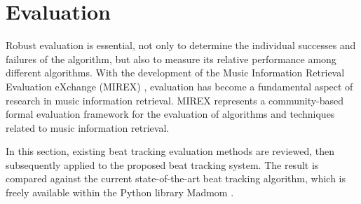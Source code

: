 \documentclass{scrartcl}
\begin{document}



\newpage
\section{Evaluation}
\label{sec:evaluation}

Robust evaluation is essential, not only to determine the individual successes and failures of the algorithm, but also to measure its relative performance among different algorithms. With the development of the Music Information Retrieval Evaluation eXchange (MIREX) \cite{Downie2008}, evaluation has become a fundamental aspect of research in music information retrieval. MIREX represents a community-based formal evaluation framework for the evaluation of algorithms and techniques related to music information retrieval.  

In this section, existing beat tracking evaluation methods are reviewed, then subsequently applied to the proposed beat tracking system. The result is compared against the current state-of-the-art beat tracking algorithm, which is freely available within the Python library Madmom \cite{Boeck2016}.




\end{document}
